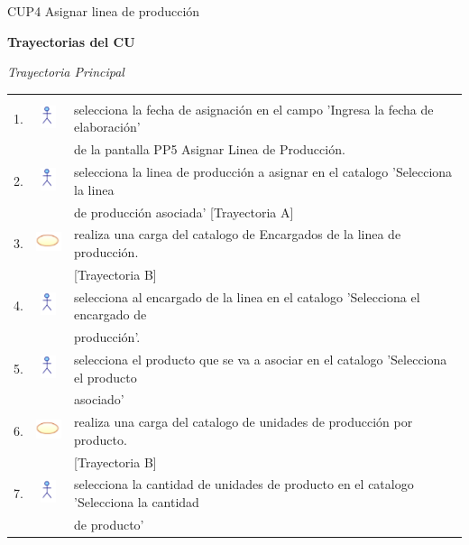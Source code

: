 \documentclass[10pt,spanish]{article}
\providecommand{\tabularnewline}{\\}
\begin{document}
\begin{table}[!ht]
	\caption{CUP4 Asignar linea de producción}
	\label{tab:CasosdeUso:nombredecasodeuso} 
	\end{table}
	
	\newpage
	\textbf{\large Trayectorias del CU}{\large \par}
	\textit{\large Trayectoria Principal}{\large{} }{\large \par}
	\begin{tabular}{ccl}
	 &  & \tabularnewline
	1. & \includegraphics{actor} & selecciona la fecha de asignación en el campo 'Ingresa la fecha de elaboración'\tabularnewline
	& &   de la pantalla PP5 Asignar Linea de Producción. \tabularnewline
	2. & \includegraphics{actor} & selecciona la linea de producción a asignar en el catalogo 'Selecciona la linea\tabularnewline 
	& &  de producción asociada' [Trayectoria A] \tabularnewline
	3. & \includegraphics{sistema} & realiza una carga del catalogo de Encargados de la linea de producción.\tabularnewline
	& & [Trayectoria B]\tabularnewline
	4. & \includegraphics{actor} & selecciona al encargado de la linea en el catalogo 'Selecciona el encargado de\tabularnewline
	& &  producción'.\tabularnewline		
	5. & \includegraphics{actor} & selecciona el producto que se va a asociar en el catalogo 'Selecciona el producto\tabularnewline
	& &  asociado' \tabularnewline
	6. & \includegraphics{sistema} & realiza una carga del catalogo de unidades de producción por producto.\tabularnewline
	& & [Trayectoria B]\tabularnewline
	7. & \includegraphics{actor} & selecciona la cantidad de unidades de producto en el catalogo 'Selecciona la cantidad\tabularnewline
	& & de producto'\tabularnewline

\end{tabular}
\end{document}
